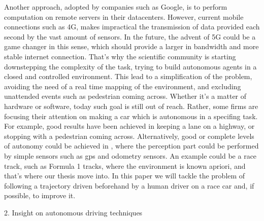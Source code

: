 Another approach, adopted by companies such as Google, is to perform computation on remote servers in their datacenters. However, current mobile connections such as 4G, makes impractical the transmission of data provided each second by the vast amount of sensors.
In the future, the advent of 5G could be a game changer in this sense, which should provide a larger in bandwidth and more stable internet connection.
That's why the scientific community is starting downstepping the complexity of the task, trying to build autonomous agents in a closed and controlled environment. This lead to a simplification of the problem, avoiding the need of a real time mapping of the environment, and excluding unattended events such as pedestrian coming across.
Whether it's a matter of hardware or software, today such goal is still out of reach. Rather, some firms are focusing their attention on making a car which is autonomous in a specifing task. For example, good results have been achieved in keeping a lane on a highway, or stopping with a pedestrian coming across. 
Alternatively, good or complete levels of autonomy could be achieved in , where the perception part could be performed by simple sensors such as gps and odometry sensors.
An example could be a race track, such as Formula 1 tracks, where the environment is known apriori, and that's where our thesis move into.
In this paper we will tackle the problem of following a trajectory driven beforehand by a human driver on a race car and, if possible, to improve it.

2. Insight on autonomous driving techniques

